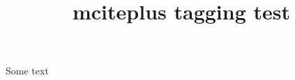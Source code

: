 \documentclass{article}
\title{mciteplus tagging test}
\begin{document}
Some text \cite{inbook-full,*article-full,*incollection-full}

\cite{manual-full}


\end{document}

